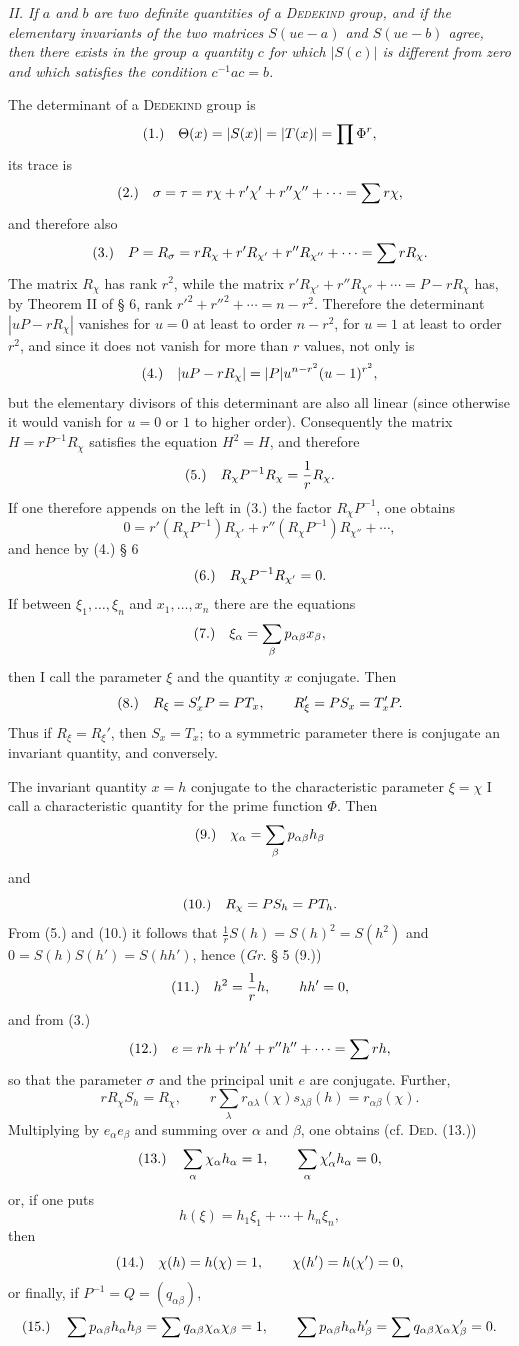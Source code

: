 \documentclass[11pt]{article}
\newcommand{\fnum}[1]{\textup{(\ensuremath{#1}.)}\quad}
\begin{document}
\emph{II. If $a$ and $b$ are two definite quantities of a \textsc{Dedekind} group, and if the elementary invariants of the two matrices $S(ue-a)$ and $S(ue-b)$ agree, then there exists in the group a quantity $c$ for which $|S(c)|$ is different from zero and which satisfies the condition $c^{-1}ac=b$.}

The determinant of a \textsc{Dedekind} group is
\[
\fnum{1} \Theta(x)=|S(x)|=|T(x)|=\prod\Phi^r,
\]
its trace is
\[
\fnum{2} \sigma=\tau=r\chi+r'\chi'+r''\chi''+\cdots=\sum r\chi,
\]
and therefore also
\[
\fnum{3} P=R_\sigma=rR_\chi+r'R_{\chi'}+r''R_{\chi''}+\cdots=\sum rR_\chi.
\]
The matrix $R_\chi$ has rank $r^2$, while the matrix $r'R_{\chi'}+r''R_{\chi''}+\cdots=P-rR_\chi$ has, by Theorem II of § 6, rank $r'^2+r''^2+\cdots=n-r^2$. Therefore the determinant $|uP-rR_\chi|$ vanishes for $u=0$ at least to order $n-r^2$, for $u=1$ at least to order $r^2$, and since it does not vanish for more than $r$ values, not only is
\[
\fnum{4} |uP-rR_\chi|=|P|u^{n-r^2}(u-1)^{r^2},
\]
but the elementary divisors of this determinant are also all linear (since otherwise it would vanish for $u=0$ or $1$ to higher order). Consequently the matrix $H=rP^{-1}R_\chi$ satisfies the equation $H^2=H$, and therefore
\[
\fnum{5} R_\chi P^{-1}R_\chi=\frac1r R_\chi.
\]
If one therefore appends on the left in (3.) the factor $R_\chi P^{-1}$, one obtains
\[
 0=r'(R_\chi P^{-1})R_{\chi'}+r''(R_\chi P^{-1})R_{\chi''}+\cdots,
\]
and hence by (4.) § 6
\[
\fnum{6} R_\chi P^{-1}R_{\chi'}=0.
\]
If between $\xi_1,\ldots,\xi_n$ and $x_1,\ldots,x_n$ there are the equations
\[
\fnum{7} \xi_\alpha=\sum_\beta p_{\alpha\beta}x_\beta,
\]
then I call the parameter $\xi$ and the quantity $x$ conjugate. Then
\[
\fnum{8} R_\xi=S_x'P=PT_x,
\qquad
R_\xi'=PS_x=T_x'P.
\]
Thus if $R_\xi=R_\xi'$, then $S_x=T_x$; to a symmetric parameter there is conjugate an invariant quantity, and conversely.

The invariant quantity $x=h$ conjugate to the characteristic parameter $\xi=\chi$ I call a characteristic quantity for the prime function $\Phi$. Then
\[
\fnum{9} \chi_\alpha=\sum_\beta p_{\alpha\beta}h_\beta
\]
and
\[
\fnum{10} R_\chi=PS_h=PT_h.
\]
From (5.) and (10.) it follows that $\frac1r S(h)=S(h)^2=S(h^2)$ and $0=S(h)S(h')=S(hh')$, hence (\emph{Gr.} § 5 (9.))
\[
\fnum{11} h^2=\frac1r h,
\qquad hh'=0,
\]
and from (3.)
\[
\fnum{12} e=rh+r'h'+r''h''+\cdots=\sum rh,
\]
so that the parameter $\sigma$ and the principal unit $e$ are conjugate. Further,
\[
 rR_\chi S_h=R_\chi,
 \qquad
 r\sum_\lambda r_{\alpha\lambda}(\chi)s_{\lambda\beta}(h)=r_{\alpha\beta}(\chi).
\]
Multiplying by $e_\alpha e_\beta$ and summing over $\alpha$ and $\beta$, one obtains (cf. \textsc{Ded}. (13.))
\[
\fnum{13} \sum_\alpha \chi_\alpha h_\alpha=1,
\qquad
\sum_\alpha \chi'_{\alpha}h_\alpha=0,
\]
or, if one puts
\[
 h(\xi)=h_1\xi_1+\cdots+h_n\xi_n,
\]
then
\[
\fnum{14} \chi(h)=h(\chi)=1,
\qquad
\chi(h')=h(\chi')=0,
\]
or finally, if $P^{-1}=Q=(q_{\alpha\beta})$,
\[
\fnum{15} \sum p_{\alpha\beta}h_\alpha h_\beta=\sum q_{\alpha\beta}\chi_\alpha\chi_\beta=1,
\qquad
\sum p_{\alpha\beta}h_\alpha h'_{\beta}=\sum q_{\alpha\beta}\chi_\alpha\chi'_{\beta}=0.
\]
\end{document}
